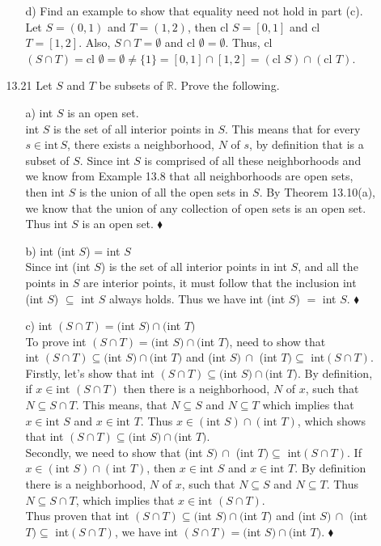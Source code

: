 \documentclass[12pt]{article}
\begin{document}
\begin{enumerate}
\begin{enumerate}
\begin{enumerate}
\item[d)] Find an example to show that equality need not hold in part (c). \\
Let $S = (0, 1)$ and $T = (1, 2)$, then cl $S = [0, 1]$ and cl $T = [1, 2]$. 
Also, $S \cap T = \emptyset$ and cl $\emptyset = \emptyset$. Thus,
cl $(S \cap T) = \mbox{cl } \emptyset = \emptyset \neq \{1\} = [0, 1] \cap [1, 2] = (\mbox{cl }S) \cap (\mbox{cl }T)$.
\end{enumerate}

\item[13.21] Let $S$ and $T$ be subsets of $\mathbb{R}$. Prove the following.
\begin{enumerate}
\item[a)] int $S$ is an open set. \\
int $S$ is the set of all interior points in $S$. This means that for every $s \in \mbox{int}\,S$, there exists a neighborhood, $N$ of $s$, by definition that is a subset of $S$. Since int $S$ is comprised of all these neighborhoods and we know from Example 13.8 that all neighborhoods are open sets, then int $S$ is the union of all the open sets in $S$. By Theorem 13.10(a), we know that the union of any collection of open sets is an open set. Thus int $S$ is an open set. $\blacklozenge$

\item[b)] int (int $S$) = int $S$ \\
Since int (int $S$) is the set of all interior points in int $S$, and all the points 
in $S$ are interior points, it must follow that the inclusion int (int $S$) $\subseteq$ int $S$ always holds. Thus we have int (int $S$) $=$ int $S$. $\blacklozenge$

\item[c)] int $(S \cap T) = ($int $S) \cap ($int $T)$ \\
To prove int $(S \cap T) = ($int $S) \cap ($int $T)$, need to show that \\
int $(S \cap T) \subseteq ($int $S) \cap ($int $T)$ and (int $S)\, \cap $ (int $T) \subseteq $ int$(S \cap T)$.
Firstly, let's show that int $(S \cap T) \subseteq ($int $S) \cap ($int $T)$. By definition, if
$x \in \mbox{int }(S \cap T)$ then there is a neighborhood, $N$ of $x$, such that $N \subseteq S \cap T$.
This means, that $N \subseteq S$ and $N \subseteq T$ which implies that $x \in \mbox{int }S$ and 
$x \in \mbox{int }T$. Thus $x \in (\mbox{int } S) \cap (\mbox{int } T)$, which shows that
int $(S \cap T) \subseteq ($int $S) \cap ($int $T)$. \\
Secondly, we need to show that (int $S)\, \cap $ (int $T) \subseteq $ int$(S \cap T)$.
If $x \in (\mbox{int }S) \cap (\mbox{int }T)$, then $x \in \mbox{int }S$ and $x \in \mbox{int }T$.
By definition there is a neighborhood, $N$ of $x$, such that $N \subseteq S$ and $N \subseteq T$.
Thus $N \subseteq S \cap T$, which implies that $x \in \mbox{int }(S \cap T)$. \\
Thus proven that int $(S \cap T) \subseteq ($int $S) \cap ($int $T)$ and 
(int $S)\, \cap $ (int $T) \subseteq $ int$(S \cap T)$, we have 
int $(S \cap T) = ($int $S) \cap ($int $T)$. $\blacklozenge$


\end{enumerate}
\end{enumerate}
\end{enumerate}
\end{document}
